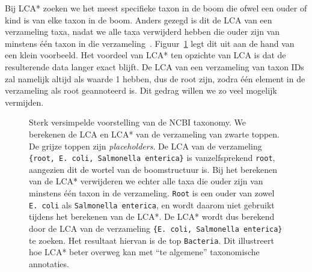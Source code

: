 Bij LCA* zoeken we het meest specifieke taxon in de boom die ofwel een ouder of kind is van elke taxon in de boom.
Anders gezegd is dit de LCA van een verzameling taxa, nadat we alle taxa verwijderd hebben die ouder zijn van minstens één taxon in die verzameling~\cite{UMGAP_paper}.
Figuur~\ref{fig:lca*_example} legt dit uit aan de hand van een klein voorbeeld.
Het voordeel van LCA* ten opzichte van LCA is dat de resulterende data langer exact blijft.
De LCA van een verzameling van taxon IDs zal namelijk altijd als waarde 1 hebben, dus de root zijn, zodra één element in de verzameling als root geannoteerd is.
Dit gedrag willen we zo veel mogelijk vermijden.
\\
\begin{figure}[H]
    \centering

    \caption{Sterk versimpelde voorstelling van de NCBI taxonomy. We berekenen de LCA en LCA* van de verzameling van zwarte toppen. De grijze toppen zijn \textit{placeholders}. De LCA van de verzameling \texttt{\{root, E. coli, Salmonella enterica\}} is vanzelfsprekend \texttt{root}, aangezien dit de wortel van de boomstructuur is. Bij het berekenen van de LCA* verwijderen we echter alle taxa die ouder zijn van minstens één taxon in de verzameling. \texttt{Root} is een ouder van zowel \texttt{E. coli} als \texttt{Salmonella enterica}, en wordt daarom niet gebruikt tijdens het berekenen van de LCA*. De LCA* wordt dus berekend door de LCA van de verzameling \texttt{\{E. coli, Salmonella enterica\}} te zoeken. Het resultaat hiervan is de top \texttt{Bacteria}. Dit illustreert hoe LCA* beter overweg kan met ``te algemene'' taxonomische annotaties.}
    \label{fig:lca*_example}
\end{figure}

